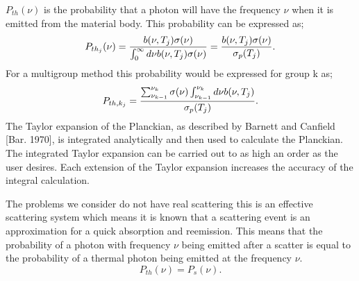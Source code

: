 	$P_{th}(\nu)$ is the probability that a photon will have the frequency $\nu$ when it is emitted from the material body. This probability can be expressed as;
	\begin{equation}
	\label{thermalDistribution}
	P_{th_j}(\nu)={b(\nu,T_j)\sigma(\nu)\over{\int^\infty_0d\nu{b(\nu,T_j)\sigma(\nu)}}}={b(\nu,T_j)\sigma(\nu)\over{\sigma_p(T_j)}}.
	\end{equation}
	For a multigroup method this probability would be expressed for group k as;
	\begin{equation}
	\label{multigroupThermalDistribution}
	P_{th,k_j}={\sum_{\nu_{k-1}}^{\nu_k}\sigma(\nu)\int_{\nu_{k-1}}^{\nu_k}d\nu b(\nu,T_j)\over{\sigma_p(T_j)}}.
	\end{equation}
	The Taylor expansion of the Planckian, as described by Barnett and Canfield [Bar. 1970], is integrated analytically and then used to calculate the Planckian. The integrated Taylor expansion can be carried out to as high an order as the user desires. Each extension of the Taylor expansion increases the accuracy of the integral calculation.
 
	The problems we consider do not have real scattering this is an effective scattering system which means it is known that a scattering event is an approximation for a quick absorption and reemission. This means that the probability of a photon with frequency $\nu$ being emitted after a scatter is equal to the probability of a thermal photon being emitted at the frequency $\nu$. 
	\begin{equation}
	P_{th}(\nu)=P_s(\nu).
	\end{equation}
	

